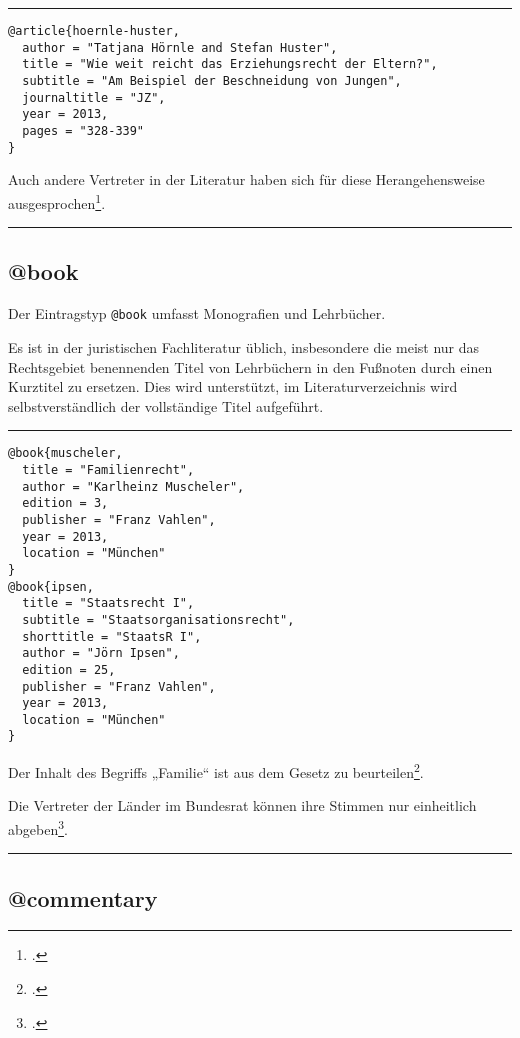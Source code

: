 \documentclass[11pt,a4paper,DIV=calc]{scrartcl}
\newenvironment{rubexample}{\par\vspace{\baselineskip}\hrule\par\begin{refsection}}{\end{refsection}\par\hrule\par\vspace{\baselineskip}}
\begin{document}
\begin{rubexample}
\begin{verbatim}
@article{hoernle-huster,
  author = "Tatjana Hörnle and Stefan Huster",
  title = "Wie weit reicht das Erziehungsrecht der Eltern?",
  subtitle = "Am Beispiel der Beschneidung von Jungen",
  journaltitle = "JZ",
  year = 2013,
  pages = "328-339"
}
\end{verbatim}

Auch andere Vertreter in der Literatur haben sich für diese
Herangehensweise ausgesprochen\footcite[330]{hoernle-huster}.

\printbibliography
\end{rubexample}

\subsection{@book}

Der Eintragstyp \verb+@book+ umfasst Monografien und Lehrbücher.

Es ist in der juristischen Fachliteratur üblich, insbesondere die
meist nur das Rechtsgebiet benennenden Titel von Lehrbüchern in den
Fußnoten durch einen Kurztitel zu ersetzen. Dies wird unterstützt, im
Literaturverzeichnis wird selbstverständlich der vollständige Titel
aufgeführt.

\begin{rubexample}

\begin{verbatim}
@book{muscheler,
  title = "Familienrecht",
  author = "Karlheinz Muscheler",
  edition = 3,
  publisher = "Franz Vahlen",
  year = 2013,
  location = "München"
}
@book{ipsen,
  title = "Staatsrecht I",
  subtitle = "Staatsorganisationsrecht",
  shorttitle = "StaatsR I",
  author = "Jörn Ipsen",
  edition = 25,
  publisher = "Franz Vahlen",
  year = 2013,
  location = "München"
}
\end{verbatim}

Der Inhalt des Begriffs „Familie“ ist aus dem Gesetz zu
beurteilen\footcite[\S\,1 Rnr. 3]{muscheler}.

Die Vertreter der Länder im Bundesrat können ihre Stimmen nur
einheitlich abgeben\footcite[\S\,7 Rnr. 343ff]{ipsen}.

\printbibliography
\end{rubexample}

\subsection{@commentary}
\end{document}
